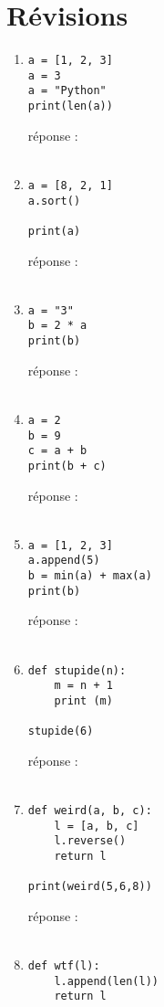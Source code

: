 \documentclass[12pt,a4paper]{article}
\newcommand{\codeintext}[1]{\texttt{#1}}
\newcommand{\response}{réponse : \hrulefill\\\\}
\begin{document}
\section*{Révisions}


\begin{enumerate}

\item
\begin{lstlisting}
a = [1, 2, 3]
a = 3
a = "Python"
print(len(a))

\end{lstlisting}
\response %

\item
\begin{lstlisting}
a = [8, 2, 1]
a.sort()

print(a)
\end{lstlisting}
\response %

\item
\begin{lstlisting}
a = "3"
b = 2 * a
print(b)
\end{lstlisting} 
\response %

\item
\begin{lstlisting}
a = 2
b = 9
c = a + b
print(b + c)
\end{lstlisting}
\response %

\item
\begin{lstlisting}
a = [1, 2, 3]
a.append(5)
b = min(a) + max(a)
print(b)
\end{lstlisting}
\response %
\pagebreak

\item
\begin{lstlisting}
def stupide(n):
	m = n + 1
	print (m)

stupide(6)

\end{lstlisting}
\response %

\item
\begin{lstlisting}
def weird(a, b, c):
	l = [a, b, c]
	l.reverse()
	return l

print(weird(5,6,8))
\end{lstlisting}
\response %

\item
\begin{lstlisting}
def wtf(l):
	l.append(len(l))
	return l
	

\end{lstlisting}
\end{enumerate}
\end{document}
